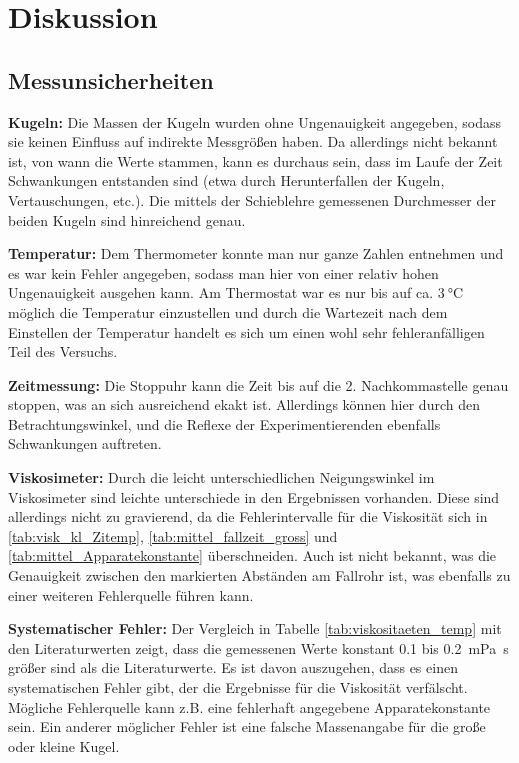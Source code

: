 \section{Diskussion}

\subsection[]{Messunsicherheiten}
\textbf{Kugeln:}
Die Massen der Kugeln wurden ohne Ungenauigkeit angegeben, sodass sie keinen Einfluss auf indirekte Messgrößen haben.
Da allerdings nicht bekannt ist, von wann die Werte stammen, kann es durchaus sein, dass im Laufe der Zeit Schwankungen entstanden sind
(etwa durch Herunterfallen der Kugeln, Vertauschungen, etc.).
Die mittels der Schieblehre gemessenen Durchmesser der beiden Kugeln sind hinreichend genau.

\textbf{Temperatur:}
Dem Thermometer konnte man nur ganze Zahlen entnehmen und es war kein Fehler angegeben, sodass man hier von einer relativ hohen Ungenauigkeit ausgehen kann.
Am Thermostat war es nur bis auf ca. $\qty{3}{\degreeCelsius}$ möglich die Temperatur einzustellen und durch die Wartezeit nach dem Einstellen der Temperatur
handelt es sich um einen wohl sehr fehleranfälligen Teil des Versuchs.

\textbf{Zeitmessung:}
Die Stoppuhr kann die Zeit bis auf die 2. Nachkommastelle genau stoppen, was an sich ausreichend ekakt ist.
Allerdings können hier durch den Betrachtungswinkel, und die Reflexe der Experimentierenden ebenfalls Schwankungen auftreten.

\textbf{Viskosimeter:}
Durch die leicht unterschiedlichen Neigungswinkel im Viskosimeter sind leichte unterschiede in den Ergebnissen vorhanden.
Diese sind allerdings nicht zu gravierend, da die Fehlerintervalle für die Viskosität sich in
 \ref{tab:visk_kl_Zitemp}, \ref{tab:mittel_fallzeit_gross} und \ref{tab:mittel_Apparatekonstante} überschneiden.
Auch ist nicht bekannt, was die Genauigkeit zwischen den markierten Abständen am Fallrohr ist, was ebenfalls zu einer weiteren Fehlerquelle führen kann.

\textbf{Systematischer Fehler:} 
Der Vergleich in Tabelle \ref{tab:viskositaeten_temp} mit den Literaturwerten zeigt, 
dass die gemessenen Werte konstant \num{0.1} bis \qty{0.2}{\milli\pascal\s} größer sind als die Literaturwerte. 
Es ist davon auszugehen, dass es einen systematischen Fehler gibt, der die Ergebnisse für die
Viskosität verfälscht.
Mögliche Fehlerquelle kann z.B. eine fehlerhaft angegebene Apparatekonstante sein.
Ein anderer möglicher Fehler ist eine falsche Massenangabe für die große oder kleine Kugel.

